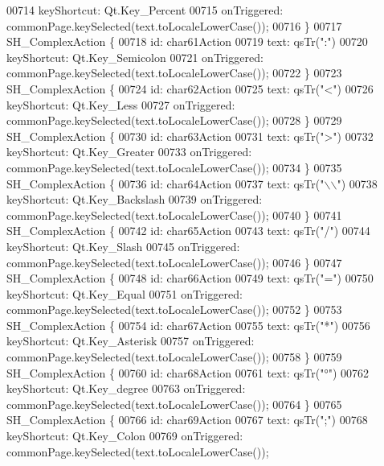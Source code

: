 \begin{DoxyCode}
{00714         keyShortcut: Qt.Key\_Percent
00715         onTriggered: commonPage.keySelected(text.toLocaleLowerCase());
00716     \}
00717     SH\_ComplexAction \{
00718         \textcolor{keywordtype}{id}: char61Action
00719         text: qsTr(\textcolor{stringliteral}{":"})
00720         keyShortcut: Qt.Key\_Semicolon
00721         onTriggered: commonPage.keySelected(text.toLocaleLowerCase());
00722     \}
00723     SH\_ComplexAction \{
00724         \textcolor{keywordtype}{id}: char62Action
00725         text: qsTr(\textcolor{stringliteral}{"<"})
00726         keyShortcut: Qt.Key\_Less
00727         onTriggered: commonPage.keySelected(text.toLocaleLowerCase());
00728     \}
00729     SH\_ComplexAction \{
00730         \textcolor{keywordtype}{id}: char63Action
00731         text: qsTr(\textcolor{stringliteral}{">"})
00732         keyShortcut: Qt.Key\_Greater
00733         onTriggered: commonPage.keySelected(text.toLocaleLowerCase());
00734     \}
00735     SH\_ComplexAction \{
00736         \textcolor{keywordtype}{id}: char64Action
00737         text: qsTr(\textcolor{stringliteral}{"\(\backslash\)\(\backslash\)"})
00738         keyShortcut: Qt.Key\_Backslash
00739         onTriggered: commonPage.keySelected(text.toLocaleLowerCase());
00740     \}
00741     SH\_ComplexAction \{
00742         \textcolor{keywordtype}{id}: char65Action
00743         text: qsTr(\textcolor{stringliteral}{"/"})
00744         keyShortcut: Qt.Key\_Slash
00745         onTriggered: commonPage.keySelected(text.toLocaleLowerCase());
00746     \}
00747     SH\_ComplexAction \{
00748         \textcolor{keywordtype}{id}: char66Action
00749         text: qsTr(\textcolor{stringliteral}{"="})
00750         keyShortcut: Qt.Key\_Equal
00751         onTriggered: commonPage.keySelected(text.toLocaleLowerCase());
00752     \}
00753     SH\_ComplexAction \{
00754         \textcolor{keywordtype}{id}: char67Action
00755         text: qsTr(\textcolor{stringliteral}{"*"})
00756         keyShortcut: Qt.Key\_Asterisk
00757         onTriggered: commonPage.keySelected(text.toLocaleLowerCase());
00758     \}
00759     SH\_ComplexAction \{
00760         \textcolor{keywordtype}{id}: char68Action
00761         text: qsTr(\textcolor{stringliteral}{"°"})
00762         keyShortcut: Qt.Key\_degree
00763         onTriggered: commonPage.keySelected(text.toLocaleLowerCase());
00764     \}
00765     SH\_ComplexAction \{
00766         \textcolor{keywordtype}{id}: char69Action
00767         text: qsTr(\textcolor{stringliteral}{";"})
00768         keyShortcut: Qt.Key\_Colon
00769         onTriggered: commonPage.keySelected(text.toLocaleLowerCase());
}
\end{DoxyCode}
